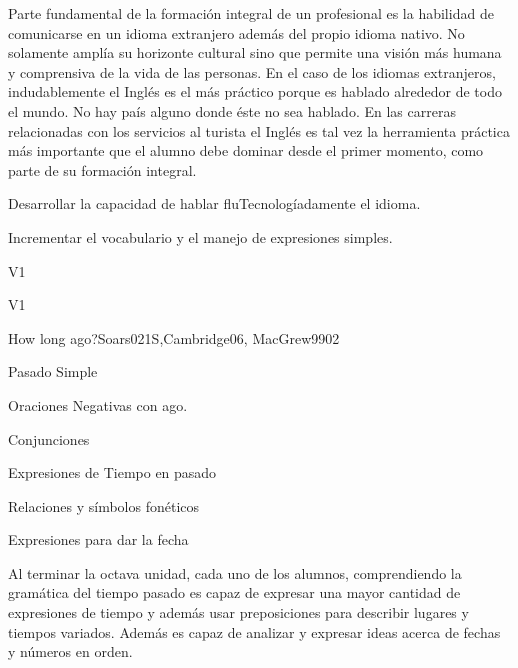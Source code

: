 \begin{syllabus}


\begin{justification}
Parte fundamental de la formación integral de un profesional es la habilidad de 
comunicarse en un idioma extranjero además del propio idioma nativo. No solamente 
amplía su horizonte cultural sino que permite una visión más humana y comprensiva 
de la vida de las personas. En el caso de los idiomas extranjeros, indudablemente 
el Inglés es el más práctico porque es hablado alrededor de todo el mundo. No hay 
país alguno donde éste no sea hablado. En las carreras relacionadas con los 
servicios al turista el Inglés es tal vez la herramienta práctica más importante 
que el alumno debe dominar desde el primer momento, como parte de su formación 
integral.
\end{justification}

\begin{goals}
    \item Desarrollar la capacidad de hablar fluTecnologíadamente el idioma.
    \item Incrementar el vocabulario y el manejo de expresiones simples.
\end{goals}

\begin{outcomes}{V1}
    \item {}
\end{outcomes}

\begin{competences}{V1}
    \item {}
\end{competences}

\begin{unit}{How long ago?}{}{Soars021S,Cambridge06, MacGrew99}{0}{2}
   \begin{topics}
      \item Pasado Simple
      \item Oraciones Negativas con ago.
      \item Conjunciones
      \item Expresiones de Tiempo en pasado
      \item Relaciones y sí­mbolos fonéticos
      \item Expresiones para dar la fecha
   \end{topics}

   \begin{learningoutcomes}
      \item Al terminar la octava unidad, cada uno de los alumnos, comprendiendo la gramática del tiempo pasado es capaz de expresar una mayor cantidad de expresiones de tiempo y además usar preposiciones para describir lugares y tiempos variados. Además es capaz de analizar y expresar ideas acerca de fechas y números en orden. 
   \end{learningoutcomes}


\end{unit}
\end{syllabus}
